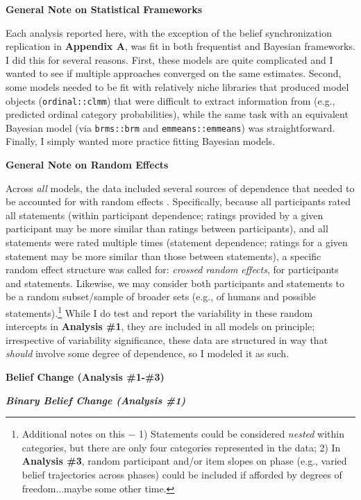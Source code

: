 \documentclass[12pt]{article}  %
\begin{document}
\noindent\textbf{General Note on Statistical Frameworks}

Each analysis reported here, with the exception of the belief synchronization replication in \textbf{Appendix A}, was fit in both frequentist and Bayesian frameworks. I did this for several reasons. First, these models are quite complicated and I wanted to see if multiple approaches converged on the same estimates. Second, some models needed to be fit with relatively niche libraries that produced model objects (\verb+ordinal::clmm+) that were difficult to extract information from (e.g., predicted ordinal category probabilities), while the same task with an equivalent Bayesian model (via \verb+brms::brm+ and \verb+emmeans::emmeans+) was straightforward. Finally, I simply wanted more practice fitting Bayesian models.

\noindent\textbf{General Note on Random Effects}

Across \textit{all} models, the data included several sources of dependence that needed to be accounted for with random effects \parencite{bliese_short_nodate,gelman2006,legler_beyond_nodate}. Specifically, because all participants rated all statements (within participant dependence; ratings provided by a given participant may be more similar than ratings between participants), and all statements were rated multiple times (statement dependence; ratings for a given statement may be more similar than those between statements), a specific random effect structure was called for: \textit{crossed random effects}, for participants and statements. Likewise, we may consider both participants and statements to be a random subset/sample of broader sets (e.g., of humans and possible statements).\footnote{Additional notes on this $-$ 1) Statements could be considered \textit{nested} within categories, but there are only four categories represented in the data; 2) In \textbf{Analysis \#3}, random participant and/or item slopes on phase (e.g., varied belief trajectories across phases) could be included if afforded by degrees of freedom...maybe some other time.} While I do test and report the variability in these random intercepts in \textbf{Analysis \#1}, they are included in all models on principle; irrespective of variability significance, these data are structured in way that \textit{should} involve some degree of dependence, so I modeled it as such. 

\noindent\textbf{Belief Change (Analysis \#1-\#3)}

\noindent\textbf{\textit{Binary Belief Change (Analysis \#1)}}
\end{document}
